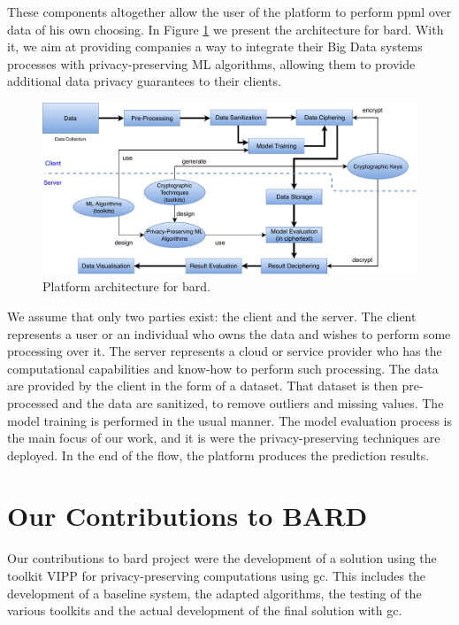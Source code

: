 These components altogether allow the user of the platform to perform \ac{ppml} over data of his own choosing.
In Figure \ref{fig:bard-architecture} we present the architecture for \ac{bard}. With it, we aim at providing companies a way to integrate their Big Data systems processes with privacy-preserving ML algorithms, allowing them to provide additional data privacy guarantees to their clients.

\begin{figure}[ht]
\centering
\includegraphics[width=1\textwidth]{images/BARDArchitecture.pdf}
\caption{Platform architecture for \acs{bard}.}
\label{fig:bard-architecture}
\end{figure}

We assume that only two parties exist: the client and the server. 
The client represents a user or an individual who owns the data and wishes to perform some processing over it. 
The server represents a cloud or service provider who has the computational capabilities and know-how to perform such processing.
The data are provided by the client in the form of a dataset. 
That dataset is then pre-processed and the data are sanitized, to remove outliers and missing values.
The model training is performed in the usual manner. 
The model evaluation process is the main focus of our work, and it is were the privacy-preserving techniques are deployed. 
In the end of the flow, the platform produces the prediction results.

\section{Our Contributions to BARD}
\label{sec:MyContributions}

Our contributions to \ac{bard} project were the development of a solution using the toolkit VIPP for privacy-preserving computations using \ac{gc}. This includes the development of a baseline system, the adapted algorithms, the testing of the various toolkits and the actual development of the final solution with \ac{gc}.


